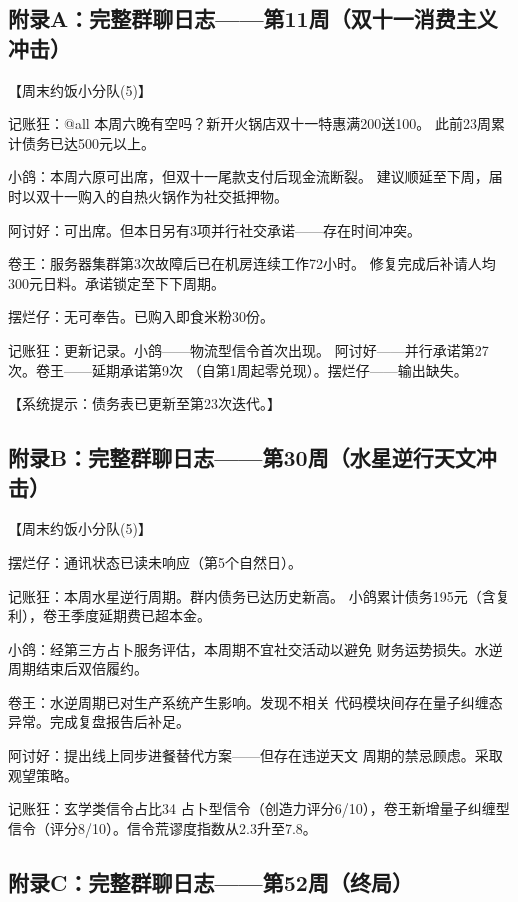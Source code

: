 \documentclass[journal]{IEEEtran}
\begin{document}
\subsection*{附录A：完整群聊日志——第11周（双十一消费主义冲击）}

\begin{chatbox}
【周末约饭小分队(5)】

记账狂：@all 本周六晚有空吗？新开火锅店双十一特惠满200送100。
此前23周累计债务已达500元以上。

小鸽：本周六原可出席，但双十一尾款支付后现金流断裂。
建议顺延至下周，届时以双十一购入的自热火锅作为社交抵押物。

阿讨好：可出席。但本日另有3项并行社交承诺——存在时间冲突。

卷王：服务器集群第3次故障后已在机房连续工作72小时。
修复完成后补请人均300元日料。承诺锁定至下下周期。

摆烂仔：无可奉告。已购入即食米粉30份。

记账狂：更新记录。小鸽——物流型信令首次出现。
阿讨好——并行承诺第27次。卷王——延期承诺第9次
（自第1周起零兑现）。摆烂仔——输出缺失。

【系统提示：债务表已更新至第23次迭代。】
\end{chatbox}

\subsection*{附录B：完整群聊日志——第30周（水星逆行天文冲击）}

\begin{chatbox}
【周末约饭小分队(5)】

摆烂仔：通讯状态已读未响应（第5个自然日）。

记账狂：本周水星逆行周期。群内债务已达历史新高。
小鸽累计债务195元（含复利），卷王季度延期费已超本金。

小鸽：经第三方占卜服务评估，本周期不宜社交活动以避免
财务运势损失。水逆周期结束后双倍履约。

卷王：水逆周期已对生产系统产生影响。发现不相关
代码模块间存在量子纠缠态异常。完成复盘报告后补足。

阿讨好：提出线上同步进餐替代方案——但存在违逆天文
周期的禁忌顾虑。采取观望策略。

记账狂：玄学类信令占比34%
占卜型信令（创造力评分6/10），卷王新增量子纠缠型
信令（评分8/10）。信令荒谬度指数从2.3升至7.8。
\end{chatbox}

\subsection*{附录C：完整群聊日志——第52周（终局）}
\end{document}
